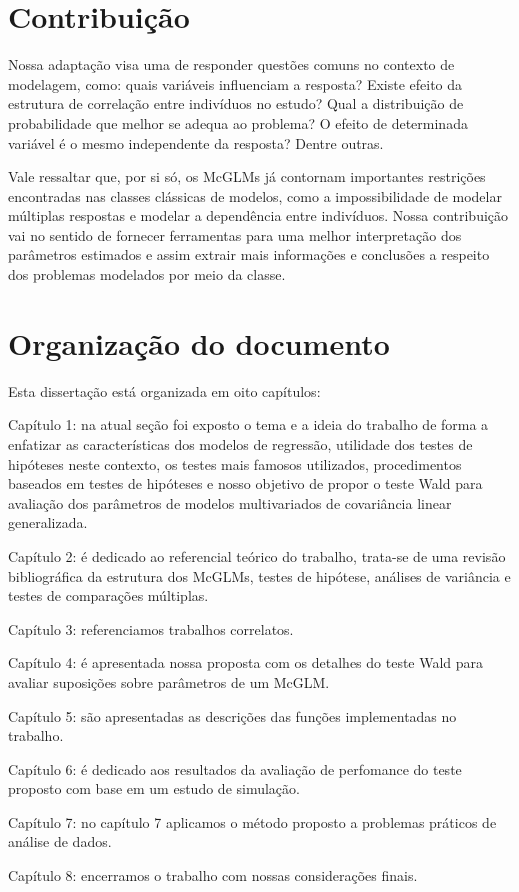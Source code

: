 
\section{Contribuição}

Nossa adaptação visa uma de responder questões comuns no contexto de modelagem, como: quais variáveis influenciam a resposta? Existe efeito da estrutura de correlação entre indivíduos no estudo? Qual a distribuição de probabilidade que melhor se adequa ao problema? O efeito de determinada variável é o mesmo independente da resposta? Dentre outras.

Vale ressaltar que, por si só, os McGLMs já contornam importantes restrições encontradas nas classes clássicas de modelos, como a impossibilidade de modelar múltiplas respostas e modelar a dependência entre indivíduos. Nossa contribuição vai no sentido de fornecer ferramentas para uma melhor interpretação dos parâmetros estimados e assim extrair mais informações e conclusões a respeito dos problemas modelados por meio da classe.


\section{Organização do documento}

Esta dissertação está organizada em oito capítulos: 

Capítulo 1: na atual seção foi exposto o tema e a ideia do trabalho de forma a enfatizar as características dos modelos de regressão, utilidade dos testes de hipóteses neste contexto, os testes mais famosos utilizados, procedimentos baseados em testes de hipóteses e nosso objetivo de propor o teste Wald para avaliação dos parâmetros de modelos multivariados de covariância linear generalizada. 

Capítulo 2: é dedicado ao referencial teórico do trabalho, trata-se de uma revisão bibliográfica da estrutura dos McGLMs, testes de hipótese, análises de variância e testes de comparações múltiplas. 

Capítulo 3: referenciamos trabalhos correlatos.

Capítulo 4: é apresentada nossa proposta com os detalhes do teste Wald para avaliar suposições sobre parâmetros de um McGLM. 

Capítulo 5: são apresentadas as descrições das funções implementadas no trabalho.

Capítulo 6: é dedicado aos resultados da avaliação de perfomance do teste proposto com base em um estudo de simulação.

Capítulo 7: no capítulo 7 aplicamos o método proposto a problemas práticos de análise de dados.

Capítulo 8: encerramos o trabalho com nossas considerações finais.

